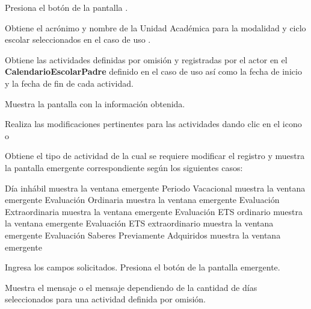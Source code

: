 
\begin{UCtrayectoria}

\UCpaso [\UCactor] Presiona el botón  de la pantalla .

\UCpaso Obtiene el acrónimo y nombre de la Unidad Académica para la modalidad y ciclo escolar seleccionados en el caso de uso . 

\UCpaso  Obtiene las actividades definidas por omisión y registradas por el actor en el \textbf{CalendarioEscolarPadre} definido en el caso de uso  así como la fecha de inicio y la fecha de fin de cada actividad.

\UCpaso Muestra la pantalla  con la información obtenida.


\UCpaso [\UCactor] Realiza las modificaciones pertinentes para las actividades dando clic en el icono \IURegistrar o \IURechazar 

\UCpaso \label{IN-DAE-CU2.6:reg} Obtiene el tipo de actividad de la cual se requiere modificar el registro y muestra la pantalla emergente correspondiente según los siguientes casos:\\

\begin{Titemize}
	\Titem Día inhábil muestra la ventana emergente 
	\Titem Periodo Vacacional muestra la ventana emergente 
	\Titem Evaluación Ordinaria muestra la ventana emergente 
	\Titem Evaluación Extraordinaria muestra la ventana emergente 
	\Titem Evaluación ETS ordinario muestra la ventana emergente 
	\Titem Evaluación ETS extraordinario muestra la ventana emergente 
	\Titem Evaluación Saberes Previamente Adquiridos muestra la ventana emergente 
	
\end{Titemize}    


\UCpaso [\UCactor] \label{IN-DAE-CU2.6:pop} Ingresa los campos solicitados.
\UCpaso [\UCactor] Presiona el botón  de la pantalla emergente.

\UCpaso \label{IN-DAE-CU2.6:dia} Muestra el mensaje  o el mensaje  dependiendo de la cantidad de días seleccionados para una actividad definida por omisión.


\end{UCtrayectoria}
